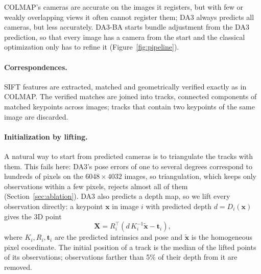 \documentclass[10pt,twocolumn,letterpaper]{article}
\begin{document}
COLMAP's cameras are accurate on the images it registers, but with few or weakly overlapping views it often
cannot register them; DA3 always predicts all cameras, but less accurately. DA3-BA starts bundle adjustment from
the DA3 prediction, so that every image has a camera from the start and the classical optimization only has to
refine it (Figure~\ref{fig:pipeline}).

\paragraph{Correspondences.}
SIFT features are extracted, matched and geometrically verified exactly as in COLMAP. The verified matches are
joined into tracks, \ie connected components of matched keypoints across images; tracks that contain two
keypoints of the same image are discarded.

\paragraph{Initialization by lifting.}
A natural way to start from predicted cameras is to triangulate the tracks with them. This fails here: DA3's
pose errors of one to several degrees correspond to hundreds of pixels on the $6048\times4032$ images, so
triangulation, which keeps only observations within a few pixels, rejects almost all of them
(Section~\ref{sec:ablation}). DA3 also predicts a depth map, so we lift every observation directly: a keypoint
$\mathbf{x}$ in image $i$ with predicted depth $d = D_i(\mathbf{x})$ gives the 3D point
\begin{equation}
\mathbf{X} = R_i^\top \left( d\, K_i^{-1} \tilde{\mathbf{x}} - \mathbf{t}_i \right),
\end{equation}
where $K_i, R_i, \mathbf{t}_i$ are the predicted intrinsics and pose and $\tilde{\mathbf{x}}$ is the
homogeneous pixel coordinate. The initial position of a track is the median of the lifted points of its
observations; observations farther than 5\% of their depth from it are removed.
\end{document}
